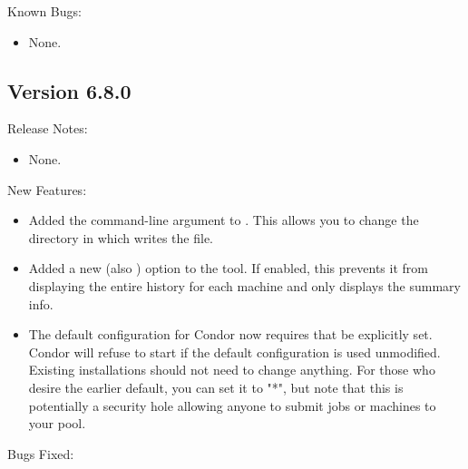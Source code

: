 \noindent Known Bugs:

\begin{itemize}

\item None.

\end{itemize}




\subsection*{\label{sec:New-6-8-0}Version 6.8.0}

\noindent Release Notes:

\begin{itemize}

\item None.

\end{itemize}


\noindent New Features:

\begin{itemize}

\item Added the  command-line argument to
.  This allows you to change the directory in which
 writes the  file.

\item Added a new  (also ) option to the
 tool.  If enabled, this prevents it from
displaying the entire history for each machine and only displays the
summary info.

\item The default configuration for Condor now requires that
 be explicitly set.  Condor will refuse
to start if the default configuration is used unmodified.
Existing installations should not need to change anything.  For
those who desire the earlier default, you can set it to "*", but
note that this is potentially a security hole allowing anyone to
submit jobs or machines to your pool.

\end{itemize}

\noindent Bugs Fixed:

